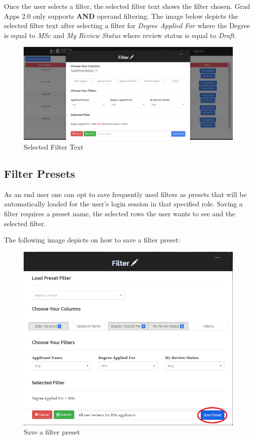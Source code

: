 \documentclass[fontsize=12pt,paper=letter,twoside]{scrartcl}
\begin{document}
\bigskip
\noindent Once the user selects a filter, the selected filter text shows the filter chosen. Grad Apps 2.0 only supports \textbf{AND} operand filtering. The image below depicts the selected filter text after selecting a filter for \emph{Degree Applied For} where the Degree is equal to \emph{MSc} and \emph{My Review Status} where review status is equal to \emph{Draft}.

\begin{figure}[!htb]
\begin{center}
\includegraphics[width=.9\textwidth]{images/selected_filter_text.png}
\end{center}
\caption{Selected Filter Text}
\label{fig:fm_selected_filter_txt}
\end{figure}

\subsection{Filter Presets}
As an end user one can opt to save frequently used filters as presets that will be automatically loaded for the user's login session in that specified role. Saving a filter requires a preset name, the selected rows the user wants to see and the selected filter. 

\bigskip
\noindent The following image depicts on how to save a filter preset:
\begin{figure}[!htb]
\begin{center}
\includegraphics[width=.9\textwidth]{images/saving_preset.png}
\end{center}
\caption{Save a filter preset}
\label{fig:saving_preset}
\end{figure}
\end{document}
